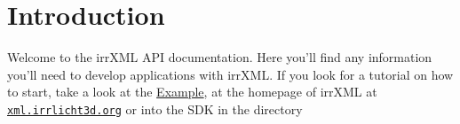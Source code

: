 \hypertarget{index_intro}{}\section{Introduction}\label{index_intro}
Welcome to the irrXML API documentation. Here you'll find any information you'll need to develop applications with irrXML. If you look for a tutorial on how to start, take a look at the \hyperlink{irrXML.h_irrxmlexample}{Example}, at the homepage of irrXML at \href{http://xml.irrlicht3d.org}{\tt xml.irrlicht3d.org} or into the SDK in the directory 